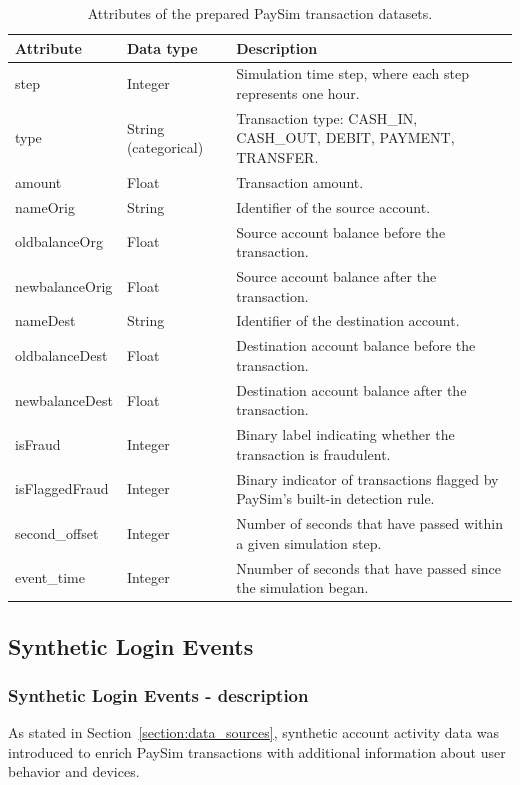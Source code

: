 \documentclass[titlepage]{article}
\begin{document}
\begin{table}[H]
    \centering
    \caption{Attributes of the prepared PaySim transaction datasets.}
    \label{tab:paysim_data_description}
    \small
    \begin{tabular}{lll}
        \toprule
        \textbf{Attribute} & \textbf{Data type} & \textbf{Description}\\
        \midrule
        step & Integer & Simulation time step, where each step represents one hour.\\
        type & String (categorical) & Transaction type: CASH\_IN, CASH\_OUT, DEBIT, PAYMENT, TRANSFER.\\
        amount & Float & Transaction amount.\\
        nameOrig & String & Identifier of the source account. \\
        oldbalanceOrg & Float & Source account balance before the transaction.\\
        newbalanceOrig & Float & Source account balance after the transaction. \\
        nameDest & String & Identifier of the destination account. \\
        oldbalanceDest & Float & Destination account balance before the transaction.\\
        newbalanceDest & Float & Destination account balance after the transaction. \\
        isFraud & Integer & Binary label indicating whether the transaction is fraudulent. \\
        isFlaggedFraud & Integer & Binary indicator of transactions flagged by PaySim's built-in detection rule. \\
        second\_offset & Integer & Number of seconds that have passed within a given simulation step. \\
        event\_time & Integer &Nnumber of seconds that have passed since the simulation began. \\
        \bottomrule
    \end{tabular}
\end{table}

\subsection{Synthetic Login Events}
\subsubsection{Synthetic Login Events - description}
As stated in Section~\ref{section:data_sources}, synthetic account activity data was introduced to enrich PaySim transactions with additional information about user behavior and devices.
\end{document}
